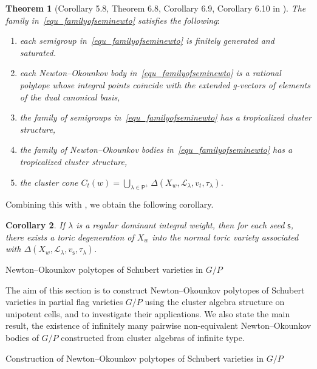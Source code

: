 \documentclass[11pt]{amsart}
\makeatletter
\def\section{\@startsection{section}{1}%
  \z@{-1.2\linespacing\@plus-.5\linespacing}{.8\linespacing}%
  {\normalfont\bfseries\large}}
\def\subsection{\@startsection{subsection}{2}%
  \z@{-.8\linespacing\@plus-.3\linespacing}{.3\linespacing\@plus.2\linespacing}%
  {\normalfont\bfseries}}
\def\mcal{\mathcal}
\numberwithin{equation}{section}
\theoremstyle{plain}
\newtheorem{theorem}{Theorem}[section]
\newtheorem{corollary}[theorem]{Corollary}
\theoremstyle{definition}
\numberwithin{equation}{section}
\newcommand{\seed}{\mathsf{s}}
\makeatother
\begin{document}
\begin{theorem}[Corollary 5.8, Theorem 6.8, Corollary 6.9, Corollary 6.10 in \cite{FO25}]\label{Thm: FO1}
The family in~\eqref{equ_familyofseminewto} satisfies the following$\colon$
\begin{enumerate}
\item each semigroup in~\eqref{equ_familyofseminewto} is finitely generated and saturated. 
\item each Newton--Okounkov body in~\eqref{equ_familyofseminewto} is a rational polytope whose integral points coincide with the extended g-vectors of elements of the dual canonical basis,
\item the family of semigroups in~\eqref{equ_familyofseminewto} has a tropicalized cluster structure,
\item the family of Newton--Okounkov bodies in~\eqref{equ_familyofseminewto} has a tropicalized cluster structure,
\item the cluster cone $C_{t}(w) = \bigcup_{\lambda \in \mathsf{P}^+} \Delta(X_w,\mcal{L}_\lambda,v_t,\tau_\lambda)$.
\end{enumerate}	
\end{theorem}	

Combining this with \cite{And13}, we obtain the following corollary.

\begin{corollary}
If $\lambda$ is a regular dominant integral weight, then for each seed $\seed$, there exists a toric degeneration of $X_w$ into the normal toric variety associated with $\Delta(X_w,\mcal{L}_\lambda,v_\seed,\tau_\lambda)$.
\end{corollary}



\section{Newton--Okounkov polytopes of Schubert varieties in $G/P$}\label{sec_NOpolyoptesforpartial}

The aim of this section is to construct Newton–Okounkov polytopes of Schubert varieties in partial flag varieties $G/P$ using the cluster algebra structure on unipotent cells, and to investigate their applications. We also state the main result, the existence of infinitely many pairwise non-equivalent Newton--Okounkov bodies of $G/P$ constructed from cluster algebras of infinite type.



\subsection{Construction of Newton--Okounkov polytopes of Schubert varieties in $G/P$}\label{subsection_constNO}
\end{document}
